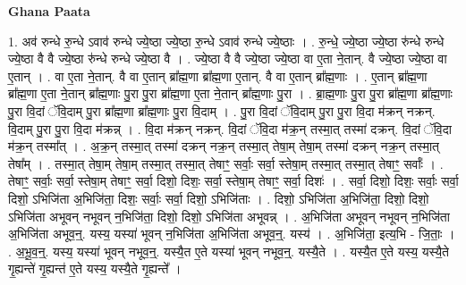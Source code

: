 \documentclass[17pt]{extarticle}
\begin{document}
\textbf{Ghana Paata } \newline

1. अव॑ रुन्धे रु॒न्धे ऽवाव॑ रुन्धे ज्ये॒ष्ठा ज्ये॒ष्ठा रु॒न्धे ऽवाव॑ रुन्धे ज्ये॒ष्ठाः । . रु॒न्धे॒ ज्ये॒ष्ठा ज्ये॒ष्ठा रु॑न्धे रुन्धे ज्ये॒ष्ठा वै वै ज्ये॒ष्ठा रु॑न्धे रुन्धे ज्ये॒ष्ठा वै । . ज्ये॒ष्ठा वै वै ज्ये॒ष्ठा ज्ये॒ष्ठा वा ए॒ता ने॒तान्. वै ज्ये॒ष्ठा ज्ये॒ष्ठा वा ए॒तान् । . वा ए॒ता ने॒तान्. वै वा ए॒तान् ब्रा᳚ह्म॒णा ब्रा᳚ह्म॒णा ए॒तान्. वै वा ए॒तान् ब्रा᳚ह्म॒णाः । . ए॒तान् ब्रा᳚ह्म॒णा ब्रा᳚ह्म॒णा ए॒ता ने॒तान् ब्रा᳚ह्म॒णाः पु॒रा पु॒रा ब्रा᳚ह्म॒णा ए॒ता ने॒तान् ब्रा᳚ह्म॒णाः पु॒रा । . ब्रा॒ह्म॒णाः पु॒रा पु॒रा ब्रा᳚ह्म॒णा ब्रा᳚ह्म॒णाः पु॒रा वि॒दां ॅवि॒दाम् पु॒रा ब्रा᳚ह्म॒णा ब्रा᳚ह्म॒णाः पु॒रा वि॒दाम् । . पु॒रा वि॒दां ॅवि॒दाम् पु॒रा पु॒रा वि॒दा म॑क्रन् नक्रन्. वि॒दाम् पु॒रा पु॒रा वि॒दा म॑क्रन्न् । . वि॒दा म॑क्रन् नक्रन्. वि॒दां ॅवि॒दा म॑क्र॒न् तस्मा॒त् तस्मा॑ दक्रन्. वि॒दां ॅवि॒दा म॑क्र॒न् तस्मा᳚त् । . अ॒क्र॒न् तस्मा॒त् तस्मा॑ दक्रन् नक्र॒न् तस्मा॒त् तेषा॒म् तेषा॒म् तस्मा॑ दक्रन् नक्र॒न् तस्मा॒त् तेषा᳚म् । . तस्मा॒त् तेषा॒म् तेषा॒म् तस्मा॒त् तस्मा॒त् तेषाꣳ॒॒ सर्वाः॒ सर्वा॒ स्तेषा॒म् तस्मा॒त् तस्मा॒त् तेषाꣳ॒॒ सर्वाः᳚ । . तेषाꣳ॒॒ सर्वाः॒ सर्वा॒ स्तेषा॒म् तेषाꣳ॒॒ सर्वा॒ दिशो॒ दिशः॒ सर्वा॒ स्तेषा॒म् तेषाꣳ॒॒ सर्वा॒ दिशः॑ । . सर्वा॒ दिशो॒ दिशः॒ सर्वाः॒ सर्वा॒ दिशो॒ ऽभिजि॑ता अ॒भिजि॑ता॒ दिशः॒ सर्वाः॒ सर्वा॒ दिशो॒ ऽभिजि॑ताः । . दिशो॒ ऽभिजि॑ता अ॒भिजि॑ता॒ दिशो॒ दिशो॒ ऽभिजि॑ता अभूवन् नभूवन् न॒भिजि॑ता॒ दिशो॒ दिशो॒ ऽभिजि॑ता अभूवन्न् । . अ॒भिजि॑ता अभूवन् नभूवन् न॒भिजि॑ता अ॒भिजि॑ता अभूव॒न्॒. यस्य॒ यस्या॑ भूवन् न॒भिजि॑ता अ॒भिजि॑ता अभूव॒न्॒. यस्य॑ । . अ॒भिजि॑ता॒ इत्य॒भि - जि॒ताः॒ । . अ॒भू॒व॒न्॒. यस्य॒ यस्या॑ भूवन् नभूव॒न्॒. यस्यै॒त ए॒ते यस्या॑ भूवन् नभूव॒न्॒. यस्यै॒ते । . यस्यै॒त ए॒ते यस्य॒ यस्यै॒ते गृ॒ह्यन्ते॑ गृ॒ह्यन्त॑ ए॒ते यस्य॒ यस्यै॒ते गृ॒ह्यन्ते᳚ । \newline
\end{document}
